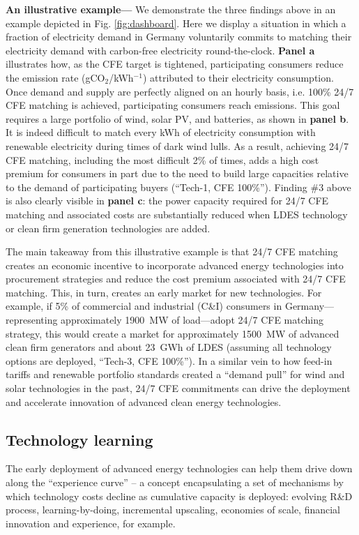 \documentclass[pdflatex,sn-basic, Numbered]{sn-jnl}
\theoremstyle{thmstyleone}%
\theoremstyle{thmstyletwo}%
\theoremstyle{thmstylethree}%
\begin{document}
\textbf{An illustrative example---} We demonstrate the three findings above in an example depicted in Fig. \ref{fig:dashboard}.
Here we display a situation in which a fraction of electricity demand in Germany voluntarily commits to matching their electricity demand with carbon-free electricity round-the-clock.
\textbf{Panel a} illustrates how, as the CFE target is tightened, participating consumers reduce the emission rate (gCO$_2$/kWh$^{-1}$) attributed to their electricity consumption. Once demand and supply are perfectly aligned on an hourly basis, i.e. 100\% 24/7 CFE matching is achieved, participating consumers reach emissions. This goal requires a large portfolio of wind, solar PV, and batteries, as shown in \textbf{panel b}. It is indeed difficult to match every kWh of electricity consumption with renewable electricity during times of dark wind lulls. As a result, achieving 24/7 CFE matching, including the most difficult 2\% of times, adds a high cost premium for consumers in part due to the need to build large capacities relative to the demand of participating buyers (\enquote{Tech-1, CFE 100\%}). Finding \#3 above is also clearly visible in \textbf{panel c}: the power capacity required for 24/7 CFE matching and associated costs are substantially reduced when LDES technology or clean firm generation technologies are added.

The main takeaway from this illustrative example is that 24/7 CFE matching creates an economic incentive to incorporate advanced energy technologies into procurement strategies and reduce the cost premium associated with 24/7 CFE matching. This, in turn, creates an early market for new technologies. For example, if 5\% of commercial and industrial (C\&I) consumers in Germany---representing approximately 1900~MW of load---adopt 24/7 CFE matching strategy, this would create a market for approximately 1500~MW of advanced clean firm generators and about 23~GWh of LDES (assuming all technology options are deployed, \enquote{Tech-3, CFE 100\%}).
In a similar vein to how feed-in tariffs and renewable portfolio standards created a \enquote{demand pull} for wind and solar technologies in the past, 24/7 CFE commitments can drive the deployment and accelerate innovation of advanced clean energy technologies.

\subsection*{Technology learning}\label{sec3}

The early deployment of advanced energy technologies can help them drive down along the \enquote{experience curve} -- a concept encapsulating a set of mechanisms by which technology costs decline as cumulative capacity is deployed: evolving R\&D process, learning-by-doing, incremental upscaling, economies of scale, financial innovation and experience, for example.
\end{document}
